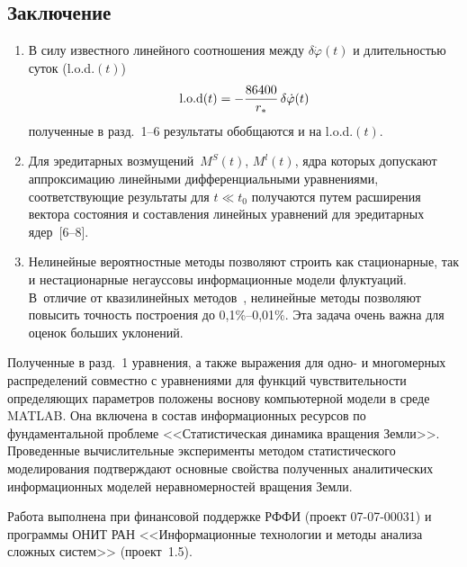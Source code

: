 \begin{multicols}{2}
\vspace*{-6pt}
\section{Заключение}

\noindent
\begin{enumerate}[1.]
\item В силу известного линейного соотношения между $\delta \dot\varphi(t)$ и длительностью суток
(l.o.d.$(t)$)~\cite{9sin}
    $$
    \mathrm{l.o.d}(t) =- \displaystyle\frac{\displaystyle 86400\mathstrut}{\displaystyle r_*\mathstrut}\,\delta \dot\varphi(t)
    $$
полученные в разд.~1--6 результаты обобщаются и на l.o.d.$(t)$.\\[-16pt]
\item
Для эредитарных возмущений~$M^S(t)$, $M^l(t)$, ядра которых допускают аппроксимацию линейными дифференциальными
уравнениями, соответствующие результаты для $t\ll t_0$ получаются путем расширения вектора состояния и
составления линейных уравнений для эредитарных ядер~[6--8].\\[-16pt]
\item
Нелинейные вероятностные методы позволяют строить как стационарные, так и нестационарные негауссовы информационные модели 
флуктуаций. В~отличие от квазилинейных методов~\cite{3sin},
 нелинейные методы позволяют повысить точность построения до 0,1\%--0,01\%. 
 Эта задача очень важна для оценок больших уклонений.\\[-13pt]
 \end{enumerate}

Полученные в разд.~1 уравнения, а также выражения для одно- и многомерных распределений
совместно с уравнениями для функций чувствительности определяющих параметров положены в\linebreak основу
компьютерной модели в среде MATLAB. Она  включена в состав информационных ресурсов по фундаментальной проблеме
<<Статистическая динамика вращения Земли>>. Проведенные вы\-чис\-ли\-тель\-ные эксперименты
методом статистического моделирования подтверждают основные свойства полученных аналитических
информационных моделей неравномерностей вращения \mbox{Земли}.

\medskip
Работа выполнена при финансовой поддержке РФФИ (проект 07-07-00031) и программы ОНИТ РАН <<Информационные технологии и методы
анализа сложных систем>> (проект~1.5).

\vspace*{-5pt}

{\small\frenchspacing
{%
\vspace*{-2pt}
\begin{thebibliography}{99}    


\end{thebibliography}}}
\end{multicols}
